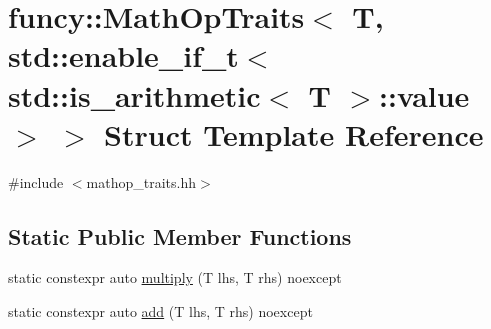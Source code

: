 \hypertarget{structfuncy_1_1MathOpTraits_3_01T_00_01std_1_1enable__if__t_3_01std_1_1is__arithmetic_3_01T_01_4_1_1value_01_4_01_4}{\section{funcy\-:\-:Math\-Op\-Traits$<$ T, std\-:\-:enable\-\_\-if\-\_\-t$<$ std\-:\-:is\-\_\-arithmetic$<$ T $>$\-:\-:value $>$ $>$ Struct Template Reference}
\label{structfuncy_1_1MathOpTraits_3_01T_00_01std_1_1enable__if__t_3_01std_1_1is__arithmetic_3_01T_01_4_1_1value_01_4_01_4}
}


{\ttfamily \#include $<$mathop\-\_\-traits.\-hh$>$}

\subsection*{Static Public Member Functions}
\begin{DoxyCompactItemize}
\item 
static constexpr auto \hyperlink{structfuncy_1_1MathOpTraits_3_01T_00_01std_1_1enable__if__t_3_01std_1_1is__arithmetic_3_01T_01_4_1_1value_01_4_01_4_a2d4c6555550b0f5717f3125456e9747a}{multiply} (T lhs, T rhs) noexcept
\item 
static constexpr auto \hyperlink{structfuncy_1_1MathOpTraits_3_01T_00_01std_1_1enable__if__t_3_01std_1_1is__arithmetic_3_01T_01_4_1_1value_01_4_01_4_a4e89db4fbd944edcd046fff0db59a7be}{add} (T lhs, T rhs) noexcept
\end{DoxyCompactItemize}


